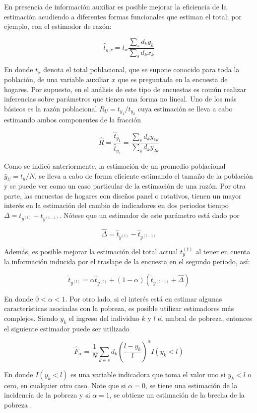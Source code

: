 \documentclass[
  12pt,
]{book}
\begin{document}
En presencia de información auxiliar es posible mejorar la eficiencia de la estimación acudiendo a diferentes formas funcionales que estiman el total; por ejemplo, con el estimador de razón:

\[
\hat{t}_{y, r} = t_x \frac{\sum_s d_k y_k}{\sum_s d_k x_k}
\]

En donde \(t_x\) denota el total poblacional, que se supone conocido para toda la población, de una variable auxiliar \(x\) que es preguntada en la encuesta de hogares. Por supuesto, en el análisis de este tipo de encuestas es común realizar inferencias sobre parámetros que tienen una forma no lineal. Uno de los más básicos es la razón poblacional \(R_U = t_{y_1} / t_{y_2}\) cuya estimación se lleva a cabo estimando ambos componentes de la fracción

\[
\hat{R}= \frac{\hat{t}_{y_1}}{\hat{t}_{y_2}}
= \frac{\sum_s d_k y_{1k}} {\sum_s d_k y_{2k}}
\]

Como se indicó anteriormente, la estimación de un promedio poblacional \(\bar{y}_U = t_y / N\), se lleva a cabo de forma eficiente estimando el tamaño de la población y se puede ver como un caso particular de la estimación de una razón. Por otra parte, las encuestas de hogares con diseños panel o rotativos, tienen un mayor interés en la estimación del cambio de indicadores en dos periodos tiempo \(\Delta = t_{y^{(t)}} - t_{y^{(t-1)}}\). Nótese que un estimador de este parámetro está dado por

\[
\hat{\Delta} = \hat{t}_{y^{(t)}} - \hat{t}_{y^{(t-1)}}
\]

Además, es posible mejorar la estimación del total actual \(t_y^{(t)}\) al tener en cuenta la información inducida por el traslape de la encuesta en el segundo periodo, así:

\[
\tilde{t}_{y^{(t)}} = \alpha \hat{t}_{y^{(t)}} 
+ (1 -\alpha) (\tilde{t}_{y^{(t-1)}} + \hat{\Delta})
\]

En donde \(0 < \alpha < 1\). Por otro lado, si el interés está en estimar algunas características asociadas con la pobreza, es posible utilizar estimadores más complejos. Siendo \(y_k\) el ingreso del individuo \(k\) y \(l\) el umbral de pobreza, entonces el siguiente estimador puede ser utilizado

\[
\hat{F}_{\alpha}=\frac{1}{N}\sum_{k\in s} d_k 
\left(\frac{l-y_k}{l}\right)^{\alpha}I(y_k<l)
\]

En donde \(I(y_k<l)\) es una variable indicadora que toma el valor uno si \(y_k<l\) o cero, en cualquier otro caso. Note que si \(\alpha = 0\), se tiene una estimación de la incidencia de la pobreza y si \(\alpha = 1\), se obtiene un estimación de la brecha de la pobreza \citep{Foster_Greer_Thorbecke_1984}.
\end{document}

